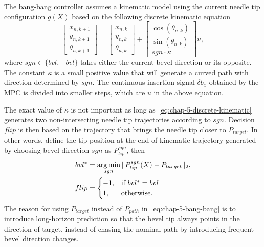 The bang-bang controller assumes a kinematic model using the current needle tip configuration $g(X)$ based on the following discrete kinematic equation
\begin{equation}
  \label{eq:chap-5-discrete-kinematic}
  \begin{bmatrix} x_{n, k + 1} \\ y_{n, k + 1} \\ \theta_{n, k + 1} \end{bmatrix} =
  \begin{bmatrix} x_{n, k} \\ y_{n, k} \\ \theta_{n, k}  \end{bmatrix} +
  \begin{bmatrix} \cos(\theta_{n, k}) \\ \sin(\theta_{n, k}) \\ sgn\cdot\kappa \end{bmatrix}u,
\end{equation}
where $sgn \in \{bvl, -bvl\}$ takes either the current bevel direction or its opposite. The constant $\kappa$ is a small positive value that will generate a curved path with direction determined by $sgn$. The continuous insertion signal $\delta b_x$ obtained by the MPC is divided into smaller steps, which are $u$ in the above equation. 

The exact value of $\kappa$ is not important as long as~\cref{eq:chap-5-discrete-kinematic} generates two non-intersecting needle tip trajectories according to $sgn$. Decision $flip$ is then based on the trajectory that brings the needle tip closer to $P_{target}$. In other words, define the tip position at the end of kinematic trajectory generated by choosing bevel direction $sgn$ as $P_{tip}^{sgn}$, then
\begin{align}
  \label{eq:chap-5-bang-bang}
  bvl^{*} &= \operatorname*{arg\,min}_{sgn} \Vert P_{tip}^{sgn}(X) - P_{target} \Vert_2, \\
  flip &= \begin{cases}
     -1, & \text{if } bvl^{*} = bvl \\
     1, & \text{otherwise.}
  \end{cases}
\end{align}
The reason for using $P_{target}$ instead of $P_{path}$ in~\cref{eq:chap-5-bang-bang} is to introduce long-horizon prediction so that the bevel tip always points in the direction of target, instead of chasing the nominal path by introducing frequent bevel direction changes.


